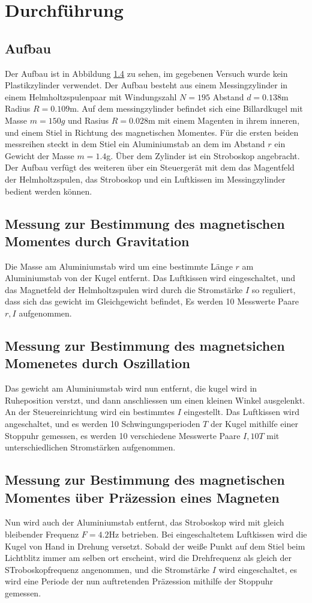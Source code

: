 \section{Durchführung}
\label{sec:Durchführung}
\subsection{Aufbau}
Der Aufbau ist in Abbildung \ref{} zu sehen, im gegebenen Versuch wurde kein Plastikzylinder verwendet.
Der Aufbau besteht aus einem Messingzylinder in einem Helmholtzspulenpaar mit Windungszahl $N = 195$ Abstand $d = 0.138$m Radius $R = 0.109$m. Auf dem messingzylinder befindet sich eine Billardkugel mit Masse $m = 150g$ und Rasius $R = 0.028$m mit einem Magenten in ihrem inneren, und einem Stiel in Richtung des magnetischen Momentes.
Für die ersten beiden messreihen steckt in dem Stiel ein Aluminiumstab an dem im Abstand $r$ ein Gewicht der Masse $m = 1.4$g. Über dem Zylinder ist ein Stroboskop angebracht. Der Aufbau verfügt des weiteren über ein Steuergerät mit dem das Magentfeld der Helmholtzspulen, 
das Stroboskop und ein Luftkissen im Messingzylinder bedient werden können.
\subsection{Messung zur Bestimmung des magnetischen Momentes durch Gravitation}
Die Masse am Aluminiumstab wird um eine bestimmte Länge $r$ am Aluminiumstab von der Kugel entfernt. Das Luftkissen wird eingeschaltet, und das Magnetfeld der Helmholtzspulen wird durch die Stromstärke $I$ so reguliert,
dass sich das gewicht im Gleichgewicht befindet, Es werden 10 Messwerte Paare $r,I$ aufgenommen.
\subsection{Messung zur Bestimmung des magnetsichen Momenetes durch Oszillation}
Das gewicht am Aluminiumstab wird nun entfernt, die kugel wird in Ruheposition verstzt, und dann anschliessen um einen kleinen Winkel ausgelenkt. An der Steuereinrichtung wird ein bestimmtes $I$ eingestellt. Das Luftkissen wird angeschaltet, und es werden 10 Schwingungsperioden $T$ der Kugel mithilfe einer Stoppuhr gemessen, es werden 10 verschiedene Messwerte Paare $I,10T$
mit unterschiedlichen Stromstärken aufgenommen.
\subsection{Messung zur Bestimmung des magnetischen Momentes über Präzession eines Magneten}
Nun wird auch der Aluminiumstab entfernt, das Stroboskop wird mit gleich bleibender Frequenz $F = 4.2$Hz betrieben. Bei eingeschaltetem Luftkissen wird die Kugel
 von Hand in Drehung versetzt. Sobald der weiße Punkt auf dem Stiel beim Lichtblitz immer am selben ort erscheint, wird die Drehfrequenz als gleich der STroboskopfrequenz angenommen, und die Stromstärke $I$ wird eingeschaltet, es wird eine Periode der nun auftretenden Präzession mithilfe der Stoppuhr gemessen.

